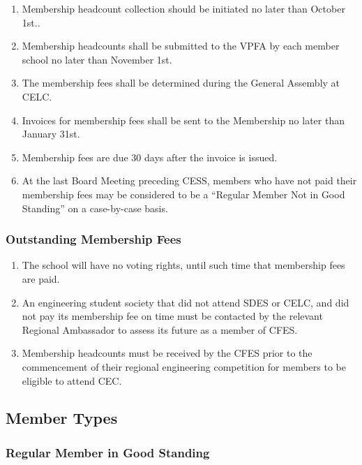 \begin{enumerate}
 \item
  Membership headcount collection should be initiated no later than October 1st..
 \item
  Membership headcounts shall be submitted to the VPFA by each member school no later than November 1st.
 \item
  The membership fees shall be determined during the General Assembly at CELC.
 \item
  Invoices for membership fees shall be sent to the Membership no later than January 31st.
 \item
  Membership fees are due 30 days after the invoice is issued.
 \item
  At the last Board Meeting preceding CESS, members who have not paid their membership fees may be considered to be a “Regular Member Not in Good Standing” on a case-by-case basis.
\end{enumerate}

\subsubsection{Outstanding Membership Fees}
\label{outstanding-membership-fees}

\begin{enumerate}
 \item The school will have no voting rights, until such time that membership fees are paid.
 \item An engineering student society that did not attend SDES or CELC, and did not pay its membership fee on time must be contacted by the relevant Regional Ambassador to assess its future as a member of CFES.
 \item Membership headcounts must be received by the CFES prior to the commencement of their regional engineering competition for members to be eligible to attend CEC.
\end{enumerate}

\subsection{Member Types}
\label{member-types}

\subsubsection{Regular Member in Good Standing}
\label{regular-member-in-good-standing}

